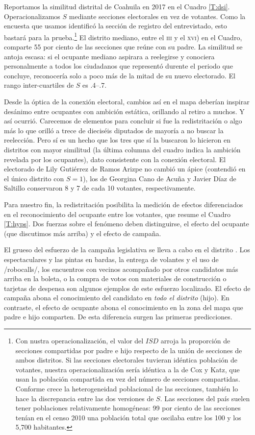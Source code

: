 \documentclass[letter,12pt]{article}
\begin{document}
Reportamos la similitud distrital de Coahuila en 2017 en el Cuadro \ref{T:dsi}. Operacionalizamos $S$ mediante secciones electorales en vez de votantes. Como la encuesta que usamos identificó la sección de registro del entrevistado, esto bastará para la prueba.\footnote{Con nustra operacionalización, el valor del $ISD$ arroja la proporción de secciones compartidas por padre e hijo respecto de la unión de secciones de ambos distritos. Si las secciones electorales tuvieran idéntica población de votantes, nuestra operacionalización sería idéntica a la de Cox y Katz, que usan la población compartida en vez del número de secciones compartidas. Conforme crece la heterogeneidad poblacional de las secciones, también lo hace la discrepancia entre las dos versiones de $S$. Las secciones del país suelen tener poblaciones relativamente homogéneas: 99 por ciento de las secciones tenían en el censo 2010 una población total que oscilaba entre los 100 y los 5,700 habitantes.} El distrito mediano, entre el \textsc{iii} y el \textsc{xvi}) en el Cuadro, comparte 55 por ciento de las secciones que reúne con su padre. La similitud se antoja escasa: si el ocupante mediano aspirara a reelegirse y conociera personalmente a todos los ciudadanos que representó durente el periodo que concluye, reconocería solo a poco más de la mitad de su nuevo electorado. El rango inter-cuartiles de $S$ es .4--.7.

Desde la óptica de la conexión electoral, cambios así en el mapa deberían inspirar desánimo entre ocupantes con ambición estática, orillando al retiro a muchos. Y así ocurrió. Carecemos de elementos para concluir si fue la redistritación o algo más lo que orilló a trece de dieciséis diputados de mayoría a no buscar la reelección. Pero sí es un hecho que los tres que sí la buscaron lo hicieron en distritos con mayor similitud (la última columna del cuadro indica la ambición revelada por los ocupantes), dato consistente con la conexión electoral. El electorado de Lily Gutiérrez de Ramos Arizpe no cambió un ápice (contendió en el único distrito con $S=1$), los de Georgina Cano de Acuña y Javier Díaz de Saltillo conservaron 8 y 7 de cada 10 votantes, respectivamente.  

Para nuestro fin, la redistritación posibilita la medición de efectos diferenciados en el reconocimiento del ocupante entre los votantes, que resume el Cuadro \ref{T:hyps}. Dos fuerzas sobre el fenómeno deben distinguirse, el efecto del ocupante (que discutimos más arriba) y el efecto de campaña.

El grueso del esfuerzo de la campaña legislativa se lleva a cabo en el distrito \citep{langston.nd}. Los espectaculares y las pintas en bardas, la entrega de volantes y el uso de /robocalls/, los encuentros con vecinos acompañado por otros candidatos más arriba en la boleta, o la compra de votos con materiales de construcción o tarjetas de despensa son algunos ejemplos de este esfuerzo localizado. El efecto de campaña abona el conocimiento del candidato en \emph{todo el distrito} (hijo). En contraste, el efecto de ocupante abona el conocimiento en la zona del mapa que padre e hijo comparten. De esta diferencia surgen las primeras predicciones.
\end{document}
